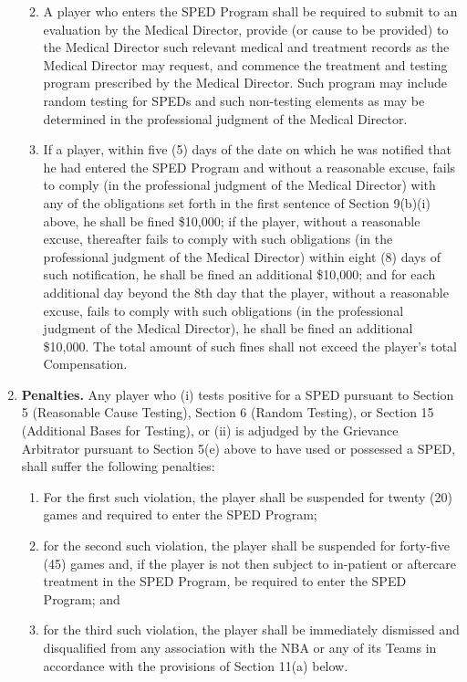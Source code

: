 \documentclass[
]{book}
\providecommand{\tightlist}{%
  \setlength{\itemsep}{0pt}\setlength{\parskip}{0pt}}
\begin{document}
\begin{enumerate}
  \begin{enumerate}
  \def\labelenumii{(\roman{enumii})}
  \tightlist
  \item
    A player who enters the SPED Program shall be required to submit to an evaluation by the Medical Director, provide (or cause to be provided) to the Medical Director such relevant medical and treatment records as the Medical Director may request, and commence the treatment and testing program prescribed by the Medical Director. Such program may include random testing for SPEDs and such non-testing elements as may be determined in the professional judgment of the Medical Director.
  \item
    If a player, within five (5) days of the date on which he was notified that he had entered the SPED Program and without a reasonable excuse, fails to comply (in the professional judgment of the Medical Director) with any of the obligations set forth in the first sentence of Section 9(b)(i) above, he shall be fined \$10,000; if the player, without a reasonable excuse, thereafter fails to comply with such obligations (in the professional judgment of the Medical Director) within eight (8) days of such notification, he shall be fined an additional \$10,000; and for each additional day beyond the 8th day that the player, without a reasonable excuse, fails to comply with such obligations (in the professional judgment of the Medical Director), he shall be fined an additional \$10,000. The total amount of such fines shall not exceed the player's total Compensation.
  \end{enumerate}
\item
  \textbf{Penalties.} Any player who (i) tests positive for a SPED pursuant to Section 5 (Reasonable Cause Testing), Section 6 (Random Testing), or Section 15 (Additional Bases for Testing), or (ii) is adjudged by the Grievance Arbitrator pursuant to Section 5(e) above to have used or possessed a SPED, shall suffer the following penalties:

  \begin{enumerate}
  \def\labelenumii{(\Alph{enumii})}
  \tightlist
  \item
    For the first such violation, the player shall be suspended for twenty (20) games and required to enter the SPED Program;
  \item
    for the second such violation, the player shall be suspended for forty-five (45) games and, if the player is not then subject to in-patient or aftercare treatment in the SPED Program, be required to enter the SPED Program; and
  \item
    for the third such violation, the player shall be immediately dismissed and disqualified from any association with the NBA or any of its Teams in accordance with the provisions of Section 11(a) below.
  \end{enumerate}
\end{enumerate}
\end{document}
